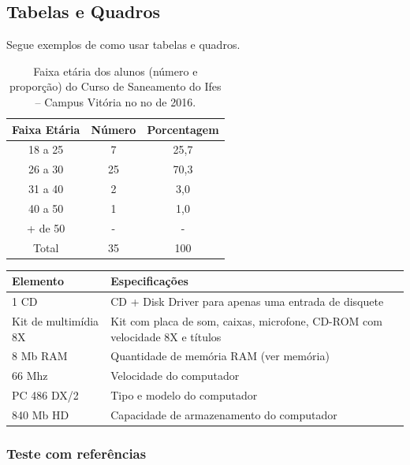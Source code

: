 \subsection{Tabelas e Quadros}

Segue exemplos de como usar tabelas e quadros.

\begin{table}[ht]
  \caption{Faixa etária dos alunos (número e proporção) do Curso de Saneamento do Ifes – Campus Vitória no no de 2016.}
  \label{tab: table1}
  \centering
  \begin{tabular}{ccc}
    \hline
    \bfseries Faixa Etária & \bfseries Número & \bfseries Porcentagem\\
    \hline
    18 a 25 & 7 & 25,7 \\
    26 a 30 & 25 & 70,3 \\
    31 a 40 & 2 & 3,0 \\
    40 a 50 & 1 & 1,0 \\
    + de 50 & - & - \\
    \hline
    Total & 35 & 100 \\
    \hline
  \end{tabular}
  \source
\end{table}
  
\begin{quadro}[ht]
  \caption{Configuração de microcomputador XP.}
  \label{quad: quadro1}
  \centering
  \begin{tabularx}{\textwidth}{lX}
    \hline
    \bfseries Elemento & \bfseries Especificações\\
    \hline
    1 CD & CD + Disk Driver para apenas uma entrada de disquete \\
    Kit de multimídia 8X & Kit com placa de som, caixas, microfone, CD-ROM com velocidade 8X e títulos \\
    8 Mb RAM & Quantidade de memória RAM (ver memória) \\
    66 Mhz & Velocidade do computador \\
    PC 486 DX/2 & Tipo e modelo do computador \\
    840 Mb HD & Capacidade de armazenamento do computador \\
    \hline
  \end{tabularx}
\end{quadro}

\subsubsection{Teste com referências}

